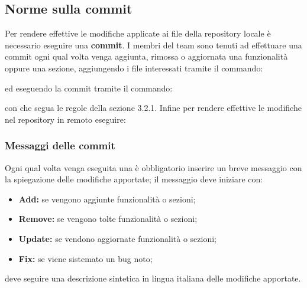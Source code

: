 	\subsection{Norme sulla commit}
	Per rendere effettive le modifiche applicate ai file della repository locale è necessario eseguire una \textbf{commit}.
	I membri del team sono tenuti ad effettuare una commit ogni qual volta venga aggiunta, rimossa o aggiornata una funzionalità oppure una sezione, aggiungendo i file interessati tramite il commando:
	\begin{center}
	\end{center}
	ed eseguendo la commit tramite il commando:
	\begin{center}
	\end{center}
	con  che segua le regole della sezione 3.2.1.
	Infine per rendere effettive le modifiche nel repository in remoto eseguire:
	\begin{center}
	\end{center}
	\subsubsection{Messaggi delle commit}
	Ogni qual volta venga eseguita una  è obbligatorio inserire un breve messaggio con la spiegazione
	delle modifiche apportate; il messaggio deve iniziare con:
	\begin{itemize}
		\item \textbf{Add:} se vengono aggiunte funzionalità o sezioni;
		\item \textbf{Remove:} se vengono tolte funzionalità o sezioni;
		\item \textbf{Update:} se vendono aggiornate funzionalità o sezioni;
		\item \textbf{Fix:} se viene sistemato un bug noto;
	\end{itemize}
	deve seguire una descrizione sintetica in lingua italiana delle modifiche apportate.
